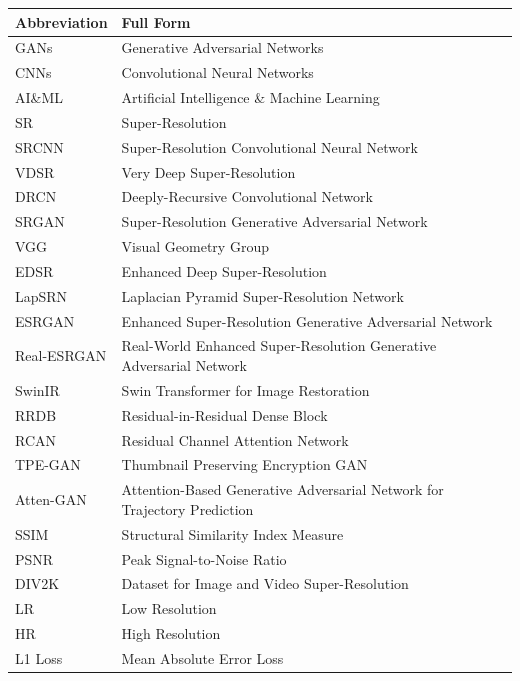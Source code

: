 \documentclass[a4paper,12pt]{report}
\begin{document}
\begin{center}
\begin{tabular}{|p{3cm}|p{11cm}|}
\hline
\textbf{Abbreviation} & \textbf{Full Form} \\
\hline
GANs & Generative Adversarial Networks \\
CNNs & Convolutional Neural Networks \\
AI\&ML & Artificial Intelligence \& Machine Learning \\
SR & Super-Resolution \\
SRCNN & Super-Resolution Convolutional Neural Network \\
VDSR & Very Deep Super-Resolution \\
DRCN & Deeply-Recursive Convolutional Network \\
SRGAN & Super-Resolution Generative Adversarial Network \\
VGG & Visual Geometry Group \\
EDSR & Enhanced Deep Super-Resolution \\
LapSRN & Laplacian Pyramid Super-Resolution Network \\
ESRGAN & Enhanced Super-Resolution Generative Adversarial Network \\
Real-ESRGAN & Real-World Enhanced Super-Resolution Generative Adversarial Network \\
SwinIR & Swin Transformer for Image Restoration \\
RRDB & Residual-in-Residual Dense Block \\
RCAN & Residual Channel Attention Network \\
TPE-GAN & Thumbnail Preserving Encryption GAN \\
Atten-GAN & Attention-Based Generative Adversarial Network for Trajectory Prediction \\
SSIM & Structural Similarity Index Measure \\
PSNR & Peak Signal-to-Noise Ratio \\
DIV2K & Dataset for Image and Video Super-Resolution \\
LR & Low Resolution \\
HR & High Resolution \\
L1 Loss & Mean Absolute Error Loss \\
\hline
\end{tabular}
\end{center}


\pagestyle{fancy}


\clearpage
{}
\setcounter{page}{1}







\printbibliography
\end{document}
